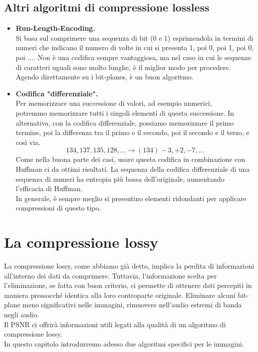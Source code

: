 \documentclass{report}
\begin{document}
	\subsection{Altri algoritmi di compressione lossless}
	\begin{itemize}
		\item \textbf{Run-Length-Encoding.}\\
		      Si basa sul comprimere una sequenza di bit (0 e 1) esprimendola in termini di numeri che indicano il numero di volte in cui si presenta 1, poi 0, poi 1, poi 0, poi $\dots$. Non è una codifica sempre vantaggiosa, ma nel caso in cui le sequenze di caratteri uguali sono molto lunghe, è il miglior modo per procedere. Agendo direttamente su i bit-planes, è un buon algoritmo.
		      
		\item \textbf{Codifica "differenziale".}\\
		      Per memorizzare una successione di valori, ad esempio numerici, \\potremmo memorizzare tutti i singoli elementi di questa successione. In alternativa, con la codifica differenziale, possiamo memorizzare il primo termine, poi la differenza tra il primo e il secondo, poi il secondo e il terzo, e così via.
		      $$
		      134,137,135,128, \dots \rightarrow(134) -3,+2,-7, \dots
		      $$
		      Come nella buona parte dei casi, usare questa codifica in combinazione con Huffman ci da ottimi risultati. La sequenza della codifica differenziale di una sequenza di numeri ha entropia più bassa dell'originale, aumentando l'efficacia di Huffman.\\
		      In generale, è sempre meglio si presentino elementi ridondanti per applicare compressioni di questo tipo.
	\end{itemize}
	
	\newpage 
	
	\section{La compressione lossy}
	La compressione lossy, come abbiamo già detto, implica la perdita di informazioni all'interno dei dati da comprimere. Tuttavia, l'informazione scelta per l'eliminazione, se fatta con buon criterio, ci permette di ottenere dati percepiti in maniera pressocché identica alla loro controparte originale. Eliminare alcuni bit-plane meno significativi nelle immagini, rimuovere nell'audio estremi di banda negli audio.\\
	Il PSNR ci offrirà informazioni utili legati alla qualità di un algoritmo di compressione lossy.\\
	In questo capitolo introdurremo adesso due algoritmi specifici per le immagini.
\end{document}
